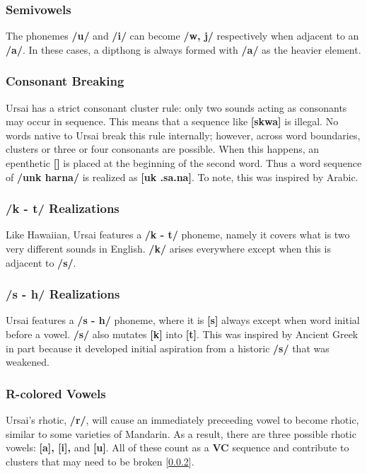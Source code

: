 \documentclass[11pt,letterpaper]{article}
\newcommand{\epsi}{\textipa{E}}
\newcommand{\engma}{\textipa{N}}
\begin{document}
		\subsubsection{Semivowels}\label{semivowel}
		\par
		The phonemes \textbf{/u/} and \textbf{/i/} can become \textbf{/w, j/} respectively when adjacent to an \textbf{/a/}.  In these cases, a dipthong is always formed with \textbf{/a/} as the heavier element.
		\subsubsection{Consonant Breaking}\label{breaking}
		\par
		Ursai has a strict consonant cluster rule: only two sounds acting as consonants may occur in sequence.  This means that a sequence like \textbf{[skwa]} is illegal.  No words native to Ursai break this rule internally; however, across word boundaries, clusters or three or four consonants are possible.  When this happens, an epenthetic \textbf{[\epsi]} is placed at the beginning of the second word.  Thus a word sequence of \textbf{/unk harna/} is realized as \textbf{[u\engma k \epsi .sa\textrhoticity .na]}.  To note, this was inspired by Arabic\cite{ArabicPhonology}.
		\subsubsection{/k - t/ Realizations}
		\par
		Like Hawaiian\cite{HawaiianPhonology}, Ursai features a \textbf{/k - t/} phoneme, namely it covers what is two very different sounds in English.  \textbf{/k/} arises everywhere except when this is adjacent to \textbf{/s/}.
		\subsubsection{/s - h/ Realizations}
		\par
		Ursai features a \textbf{/s - h/} phoneme, where it is \textbf{[s]} always except when word initial before a vowel.  \textbf{/s/} also mutates \textbf{[k]} into \textbf{[t]}.  This was inspired by Ancient Greek\cite{GreekPhonology} in part because it developed initial aspiration from a historic \textbf{/s/} that was weakened.
		\subsubsection{R-colored Vowels}
		Ursai's rhotic, \textbf{/r/}, will cause an immediately preceeding vowel to become rhotic, similar to some varieties of Mandarin\cite{Erhua}.  As a result, there are three possible rhotic vowels: \textbf{[a\textrhoticity], [i\textrhoticity],} and \textbf{[u\textrhoticity]}. All of these count as a \textbf{VC} sequence and contribute to clusters that may need to be broken [\ref{breaking}].
\end{document}
